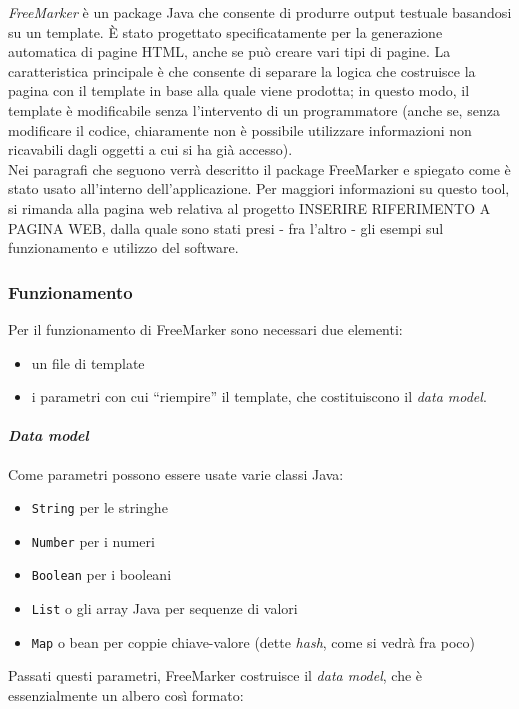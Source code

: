 
\textsl{FreeMarker} è un package Java che consente di produrre output testuale basandosi su un template. È stato progettato specificatamente per la generazione automatica di pagine HTML, anche se può creare vari tipi di pagine. La caratteristica principale è che consente di separare la logica che costruisce la pagina con il template in base alla quale viene prodotta; in questo modo, il template è modificabile senza l'intervento di un programmatore (anche se, senza modificare il codice, chiaramente non è possibile utilizzare informazioni non ricavabili dagli oggetti a cui si ha già accesso).\\
Nei paragrafi che seguono verrà descritto il package FreeMarker e spiegato come è stato usato all'interno dell'applicazione. Per maggiori informazioni su questo tool, si rimanda alla pagina web relativa al progetto INSERIRE RIFERIMENTO A PAGINA WEB, dalla quale sono stati presi - fra l'altro - gli esempi sul funzionamento e utilizzo del software.


\subsubsection{Funzionamento}
Per il funzionamento di FreeMarker sono necessari due elementi:
\begin{itemize}
\item un file di template
\item i parametri con cui \textquotedblleft riempire\textquotedblright{} il template, che costituiscono il \textit{data model}.
\end{itemize}

\paragraph{\textit{Data model}}
Come parametri possono essere usate varie classi Java:

\begin{itemize}
\item \lstinline{String} per le stringhe
\item \lstinline{Number} per i numeri
\item \lstinline{Boolean} per i booleani
\item \lstinline{List} o gli array Java per sequenze di valori
\item \lstinline{Map} o bean per coppie chiave-valore (dette \textsl{hash}, come si vedrà fra poco)
\end{itemize}

Passati questi parametri, FreeMarker costruisce il \textit{data model}, che è essenzialmente un albero così formato:

